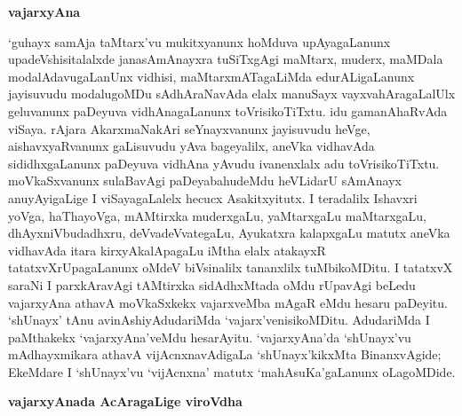 \begin{center}
{\Large\bf vajarxyAna}
\end{center}

`guhayx samAja taMtarx'vu mukitxyanunx hoMduva upAyagaLanunx upadeVshisi\-talalxde janasAmAnayxra tuSiTxgAgi maMtarx, muderx, maMDala modalAdavugaLanUnx vidhisi, maMtarxmATagaLiMda edurALigaLanunx jayisuvudu modalugoMDu sAdhAraNavAda elalx manuSayx vayxvahAragaLalUlx geluvanunx paDeyuva vidhAnagaLanunx toVrisikoTiTxtu. idu gamanAhaRvAda viSaya. rAjara AkarxmaNakAri seYnayxvanunx jayisuvudu heVge, aishavxyaRvanunx gaLisuvudu yAva bageyalilx, aneVka vidhavAda sididhxgaLanunx paDeyuva vidhAna yAvudu ivanenxlalx adu toVrisikoTiTxtu. moVkaSxvanunx sulaBavAgi paDeyabahudeMdu heVLidarU sAmAnayx anuyAyigaLige I viSayagaLalelx hecucx Asakitxyitutx. I teradalilx Ishavxri yoVga, haThayoVga, mAMtirxka muderxgaLu, yaMtarxgaLu maMtarxgaLu, dhAyxniVbudadhxru, deVvadeVvategaLu, Ayukatxra kalapxgaLu matutx aneVka vidhavAda itara kirxyAkalApagaLu iMtha elalx atakayxR tatatxvXrUpagaLanunx oMdeV biVsinalilx tananxlilx tuMbikoMDitu. I tatatxvX saraNi I parxkAravAgi tAMtirxka sidAdhxMtada oMdu rUpavAgi beLedu vajarxyAna athavA moVkaSxkekx vajarxveMba mAgaR eMdu hesaru paDeyitu. `shUnayx' tAnu avinAshiyAdudariMda `vajarx'venisikoMDitu. AdudariMda I paMthakekx `vajarxyAna'veMdu hesarAyitu. `vajarxyAna'da `shUnayx'vu mAdhayxmikara athavA vijAcnxnavAdigaLa `shUnayx'kikxMta BinanxvAgide; EkeMdare I `shUnayx'vu `vijAcnxna' matutx `mahAsuKa'gaLanunx oLagoMDide.

\begin{center}
{\Large\bf vajarxyAnada AcAragaLige viroVdha}
\end{center}

